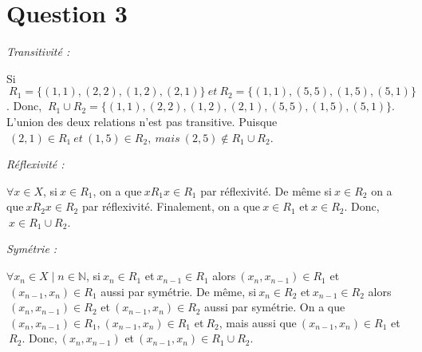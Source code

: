 \section*{Question 3}
\noindent
\emph{Transitivité :}

Si$\ R_1 = \{(1,1), (2,2), (1,2), (2,1)\}\ et\ R_2 = \{(1,1), (5,5), (1,5), (5,1)\}$. Donc, $\ R_1 \cup R_2 = \{(1,1), (2,2), (1,2), (2,1), (5,5), (1,5), (5,1)\}$. L'union des  deux relations n'est pas transitive. Puisque$\ (2,1) \in R_1\ et\ (1,5) \in R_2,\ mais\ (2,5) \notin R_1 \cup R_2$.

\bigskip

\emph{Réflexivité :}

$\forall x\in X$, si$\ x\in R_1$, on a que$\ xR_1x \in R_1$ par réflexivité. De même si$\ x\in R_2$ on a que$\ xR_2x \in R_2$ par réflexivité. Finalement, on a que$\ x \in R_1$ et$\ x \in R_2$. Donc,$\ x \in R_1\cup R_2$.

\bigskip

\emph{Symétrie : }

$\forall x_n \in X \mid n \in \mathbb{N}$, si$\ x_n \in R_1$ et$\ x_{n-1} \in R_1$ alors$\ (x_n,x_{n-1}) \in R_1$ et$\ (x_{n-1}, x_n) \in R_1$ aussi par symétrie. De même, si$\ x_n \in R_2$ et$\ x_{n-1} \in R_2$ alors$\ (x_n,x_{n-1}) \in R_2$ et$\ (x_{n-1}, x_n) \in R_2$ aussi par symétrie. On a que$\ (x_n, x_{n-1}) \in R_1$,$\ (x_{n-1}, x_n) \in R_1$ et$\ R_2$, mais aussi que$\ (x_{n-1}, x_n) \in R_1$ et$\ R_2$. Donc,$\ (x_n, x_{n-1})$ et$\ (x_{n-1}, x_n) \in R_1 \cup R_2$.